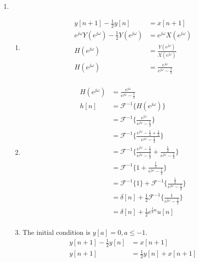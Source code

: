 \documentclass[10pt,a4paper, margin=1in]{article}
\begin{document}
\begin{enumerate}
\item %
	\begin{enumerate}
    \item %
    \begin{align*}
        y[n + 1] - \frac{1}{2}y[n] &= x[n + 1] \\ 
        e^{j\omega}Y(e^{j\omega}) - \frac{1}{2}Y(e^{j\omega}) &= e^{j\omega}X(e^{j\omega}) \\
        H(e^{j\omega}) &= \frac{Y(e^{j\omega})}{X(e^{j\omega})} \\
        H(e^{j\omega}) &= \frac{e^{j\omega}}{e^{j\omega} - \frac{1}{2}} \\
    \end{align*}
    \item %
    \begin{align*}
        H(e^{j\omega}) &= \frac{e^{j\omega}}{e^{j\omega} - \frac{1}{2}} \\
        h[n] &= \mathcal{F}^{-1}\{H(e^{j\omega})\} \\
        &= \mathcal{F}^{-1}\{\frac{e^{j\omega}}{e^{j\omega} - \frac{1}{2}}\} \\
        &= \mathcal{F}^{-1}\{\frac{e^{j\omega} - \frac{1}{2} + \frac{1}{2}}{e^{j\omega} - \frac{1}{2}}\} \\
        &= \mathcal{F}^{-1}\{\frac{e^{j\omega} - \frac{1}{2}}{e^{j\omega} - \frac{1}{2}} + \frac{\frac{1}{2}}{e^{j\omega} - \frac{1}{2}}\} \\
        &= \mathcal{F}^{-1}\{1 + \frac{\frac{1}{2}}{e^{j\omega} - \frac{1}{2}}\} \\
        &= \mathcal{F}^{-1}\{1\} + \mathcal{F}^{-1}\{\frac{\frac{1}{2}}{e^{j\omega} - \frac{1}{2}}\} \\
        &= \delta[n] + \frac{1}{2}\mathcal{F}^{-1}\{\frac{1}{e^{j\omega} - \frac{1}{2}}\} \\
        &= \delta[n] + \frac{1}{2}e^{\frac{1}{2}n}u[n] \\
    \end{align*}
	\item %
    The initial condition is $y[a] = 0, a \leq -1$.
    \begin{align*}
        y[n + 1] - \frac{1}{2}y[n] &= x[n + 1] \\
        y[n + 1] &= \frac{1}{2}y[n] + x[n + 1] \\

\end{align*}
\end{enumerate}
\end{enumerate}
\end{document}
